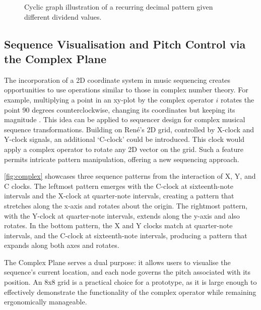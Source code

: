 \documentclass[12pt]{article}
\numberwithin{subsubsubsection}{subsubsection}
\begin{document}
\begin{figure}[ht]
    \centering
    \caption{Cyclic graph illustration of a recurring decimal pattern given different dividend values.}
    \label{fig:cyclic}
\end{figure}

\subsection{Sequence Visualisation and Pitch Control via the Complex Plane}
\label{appendix:complexplane}

The incorporation of a 2D coordinate system in music sequencing creates opportunities to use operations similar to those in complex number theory. For example, multiplying a point in an xy-plot by the complex operator $i$ rotates the point 90 degrees counterclockwise, changing its coordinates but keeping its magnitude \cite{Riley}. This idea can be applied to sequencer design for complex musical sequence transformations. Building on René's 2D grid, controlled by X-clock and Y-clock signals, an additional `C-clock' could be introduced. This clock would apply a complex operator to rotate any 2D vector on the grid. Such a feature permits intricate pattern manipulation, offering a new sequencing approach.
\newpage

\autoref{fig:complex} showcases three sequence patterns from the interaction of X, Y, and C clocks. The leftmost pattern emerges with the C-clock at sixteenth-note intervals and the X-clock at quarter-note intervals, creating a pattern that stretches along the x-axis and rotates about the origin. The rightmost pattern, with the Y-clock at quarter-note intervals, extends along the y-axis and also rotates. In the bottom pattern, the X and Y clocks match at quarter-note intervals, and the C-clock at sixteenth-note intervals, producing a pattern that expands along both axes and rotates. 

The Complex Plane serves a dual purpose: it allows users to visualise the sequence's current location, and each node governs the pitch associated with its position. An 8x8 grid is a practical choice for a prototype, as it is large enough to effectively demonstrate the functionality of the complex operator while remaining ergonomically manageable.
\end{document}
